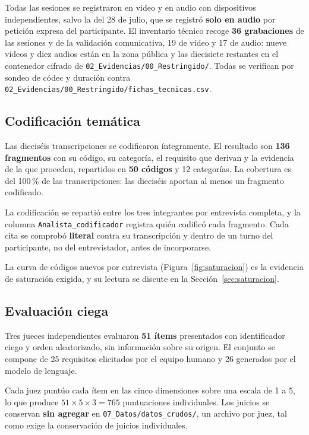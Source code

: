 \documentclass[11pt,a4paper]{article}
\begin{document}
Todas las sesiones se registraron en video y en audio con dispositivos independientes,
salvo la del 28 de julio, que se registr\'o \textbf{solo en audio} por petici\'on
expresa del participante. El inventario t\'ecnico recoge \textbf{36 grabaciones} de las
sesiones y de la validaci\'on comunicativa, 19 de v\'ideo y 17 de audio: nueve v\'ideos y diez
audios est\'an en la zona p\'ublica y las diecisiete restantes en el contenedor cifrado de
\texttt{02\_Evidencias/00\_Restringido/}. Todas se verifican por sondeo de c\'odec y duraci\'on
contra \texttt{02\_Evidencias/00\_Restringido/fichas\_tecnicas.csv}.

\subsection{Codificaci\'on tem\'atica}

Las diecis\'eis transcripciones se codificaron \'integramente. El resultado son
\textbf{136 fragmentos} con su c\'odigo, su categor\'ia, el requisito que derivan y la
evidencia de la que proceden, repartidos en \textbf{50 c\'odigos} y 12 categor\'ias. La
cobertura es del 100\,\% de las transcripciones: las diecis\'eis aportan al menos un
fragmento codificado.

La codificaci\'on se reparti\'o entre los tres integrantes por entrevista completa, y la
columna \texttt{Analista\_codificador} registra qui\'en codific\'o cada fragmento. Cada
cita se comprob\'o \textbf{literal} contra su transcripci\'on y dentro de un turno del
participante, no del entrevistador, antes de incorporarse.

La curva de c\'odigos nuevos por entrevista (Figura~\ref{fig:saturacion}) es la
evidencia de saturaci\'on exigida, y su lectura se discute en la
Secci\'on~\ref{sec:saturacion}.

\subsection{Evaluaci\'on ciega}

Tres jueces independientes evaluaron \textbf{51 \'items} presentados con identificador
ciego y orden aleatorizado, sin informaci\'on sobre su origen. El conjunto se compone de
25 requisitos elicitados por el equipo humano y 26 generados por el modelo de lenguaje.

Cada juez punt\'uo cada \'item en las cinco dimensiones sobre una escala de 1 a 5, lo
que produce $51 \times 5 \times 3 = 765$ puntuaciones individuales. Los juicios se
conservan \textbf{sin agregar} en \texttt{07\_Datos/datos\_crudos/}, un archivo por
juez, tal como exige la conservaci\'on de juicios individuales.
\end{document}
